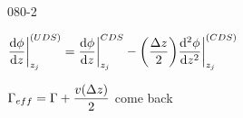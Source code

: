 \begin{mitframe}{080-2}
 \begin{listone}
	\item $\dfrac{\mathrm{d}\eleccoeff}{\mathrm{d}z}\bigg|_{z_j}^{(UDS)}=\dfrac{\mathrm{d}\eleccoeff}{\mathrm{d}z}\bigg|_{z_j}^{CDS}-\bigg(\dfrac{\iipf{z}}{2}\bigg)\dfrac{\mathrm{d}^2\eleccoeff}{\mathrm{d}z^2}\bigg|_{z_j}^{(CDS)}$
    \item $\Gamma_{eff}=\Gamma+\dfrac{\vvel(\iipf{z})}{2}$ come back
\end{listone}   
\end{mitframe}